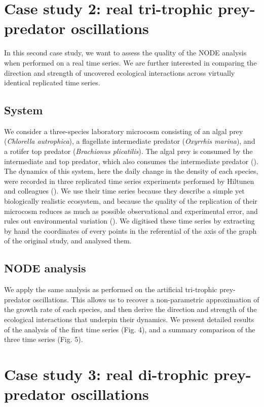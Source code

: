 \documentclass[11pt, oneside]{article}
\begin{document}
\section{Case study 2: real tri-trophic prey-predator oscillations}

In this second case study, we want to assess the quality of the NODE analysis when performed on a real time series.
We are further interested in comparing the direction and strength of uncovered ecological interactions across virtually identical replicated time series.

\subsection{System}

We consider a three-species laboratory microcosm consisting of an algal prey (\textit{Chlorella autrophica}), a flagellate intermediate predator (\textit{Oxyrrhis marina}), and a rotifer top predator (\textit{Brachionus plicatilis}).
The algal prey is consumed by the intermediate and top predator, which also consumes the intermediate predator (\cite{Arndt1993}).
The dynamics of this system, here the daily change in the density of each species, were recorded in three replicated time series experiments performed by Hiltunen and colleagues (\cite{Hiltunen2013}). 
We use their time series because they describe a simple yet biologically realistic ecosystem, and because the quality of the replication of their microcosm reduces as much as possible observational and experimental error, and rules out environmental variation (\cite{Hiltunen2013}).
We digitised these time series by extracting by hand the coordinates of every points in the referential of the axis of the graph of the original study, and analysed them.

\subsection{NODE analysis}

We apply the same analysis as performed on the artificial tri-trophic prey-predator oscillations.
This allows us to recover a non-parametric approximation of the growth rate of each species, and then derive the direction and strength of the ecological interactions that underpin their dynamics.
We present detailed results of the analysis of the first time series (Fig. 4), and a summary comparison of the three time series (Fig. 5).

\section{Case study 3: real di-trophic prey-predator oscillations}
\end{document}

